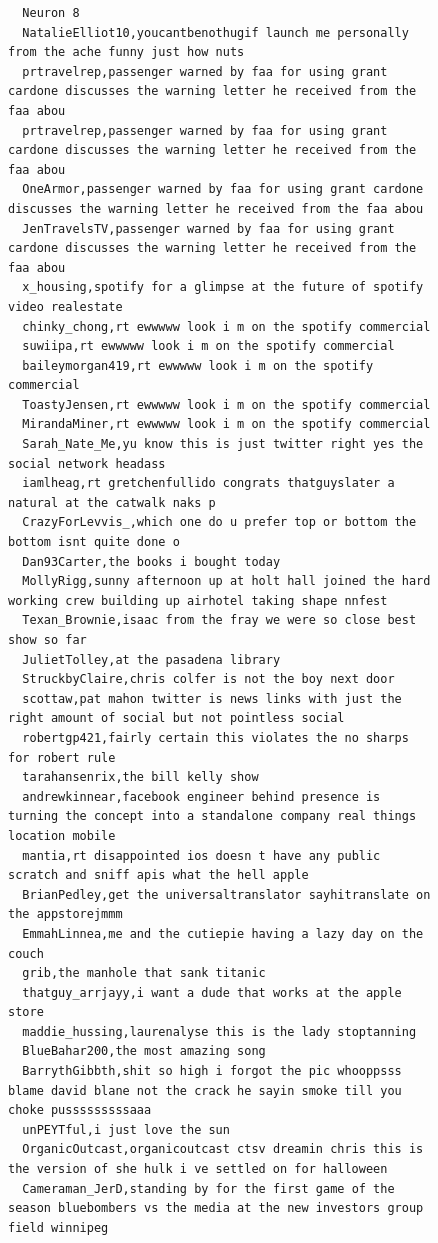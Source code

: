\begin{figure}[htpb]
\begin{verbatim}
  Neuron 8
  NatalieElliot10,youcantbenothugif launch me personally from the ache funny just how nuts
  prtravelrep,passenger warned by faa for using grant cardone discusses the warning letter he received from the faa abou
  prtravelrep,passenger warned by faa for using grant cardone discusses the warning letter he received from the faa abou
  OneArmor,passenger warned by faa for using grant cardone discusses the warning letter he received from the faa abou
  JenTravelsTV,passenger warned by faa for using grant cardone discusses the warning letter he received from the faa abou
  x_housing,spotify for a glimpse at the future of spotify video realestate
  chinky_chong,rt ewwwww look i m on the spotify commercial
  suwiipa,rt ewwwww look i m on the spotify commercial
  baileymorgan419,rt ewwwww look i m on the spotify commercial
  ToastyJensen,rt ewwwww look i m on the spotify commercial
  MirandaMiner,rt ewwwww look i m on the spotify commercial
  Sarah_Nate_Me,yu know this is just twitter right yes the social network headass
  iamlheag,rt gretchenfullido congrats thatguyslater a natural at the catwalk naks p
  CrazyForLevvis_,which one do u prefer top or bottom the bottom isnt quite done o
  Dan93Carter,the books i bought today
  MollyRigg,sunny afternoon up at holt hall joined the hard working crew building up airhotel taking shape nnfest
  Texan_Brownie,isaac from the fray we were so close best show so far
  JulietTolley,at the pasadena library
  StruckbyClaire,chris colfer is not the boy next door
  scottaw,pat mahon twitter is news links with just the right amount of social but not pointless social
  robertgp421,fairly certain this violates the no sharps for robert rule
  tarahansenrix,the bill kelly show
  andrewkinnear,facebook engineer behind presence is turning the concept into a standalone company real things location mobile
  mantia,rt disappointed ios doesn t have any public scratch and sniff apis what the hell apple
  BrianPedley,get the universaltranslator sayhitranslate on the appstorejmmm
  EmmahLinnea,me and the cutiepie having a lazy day on the couch
  grib,the manhole that sank titanic
  thatguy_arrjayy,i want a dude that works at the apple store
  maddie_hussing,laurenalyse this is the lady stoptanning
  BlueBahar200,the most amazing song
  BarrythGibbth,shit so high i forgot the pic whooppsss blame david blane not the crack he sayin smoke till you choke pusssssssssaaa
  unPEYTful,i just love the sun
  OrganicOutcast,organicoutcast ctsv dreamin chris this is the version of she hulk i ve settled on for halloween
  Cameraman_JerD,standing by for the first game of the season bluebombers vs the media at the new investors group field winnipeg

\end{verbatim}
\end{figure}
